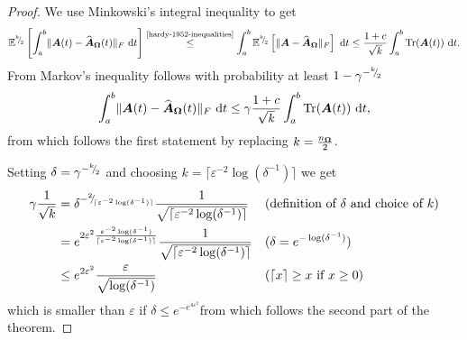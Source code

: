 \documentclass[12pt]{article}
\begin{document}
\begin{proof}
    We use Minkowski's integral inequality \cite[theorem 202]{hardy-1952-inequalities} to get
    \begin{equation}
        \mathbb{E}^{\sfrac{k}{2}}\left[ \int_{a}^{b} \lVert \mtx{A}(t) - \Nystr{\mtx{\Omega}}{\mtx{A}}(t) \rVert _F~\mathrm{d}t \right] 
        \stackrel{\text{\cite{hardy-1952-inequalities}}}{\leq} \int_{a}^{b} \mathbb{E}^{\sfrac{k}{2}} \left[\lVert \mtx{A} - \Nystr{\mtx{\Omega}}{\mtx{A}} \rVert _F \right] ~\mathrm{d}t%
        \leq \frac{1 + c}{\sqrt{k}} \int_{a}^{b} \Trace(\mtx{A}(t))~\mathrm{d}t.
    \end{equation}
    From Markov's inequality follows with probability at least $1 - \gamma^{-{}^{k}{\mskip -5mu/\mskip -3mu}_{2}}$
    \begin{equation}
        \int_{a}^{b} \lVert \boldsymbol{A}(t) - \widehat{\boldsymbol{A}}_{\boldsymbol{\Omega}}(t) \rVert _F~\mathrm{d}t \leq \gamma \frac{1 + c}{\sqrt{k}} \int_{a}^{b} \operatorname{Tr}(\boldsymbol{A}(t))~\mathrm{d}t,
    \end{equation}
    from which follows the first statement by replacing $k = \frac{n_{\boldsymbol{\Omega}}}{2}$.

    Setting $\delta = \gamma^{-{}^{k}{\mskip -5mu/\mskip -3mu}_{2}}$ and choosing $k = \lceil \varepsilon^{-2}\log(\delta^{-1}) \rceil$ we get
    \begin{align}
        \gamma \frac{1}{\sqrt{k}}
        &= \delta^{-{}^{2}{\mskip -5mu/\mskip -3mu}_{\lceil \varepsilon^{-2} \log(\delta^{-1}) \rceil}} \frac{1}{\sqrt{\lceil \varepsilon^{-2} \log(\delta^{-1}) \rceil}} && \text{(definition of $\delta$ and choice of $k$)} \notag \\
        &= e^{2\varepsilon^{2} \frac{\varepsilon^{-2}\log(\delta^{-1})}{\lceil \varepsilon^{-2} \log(\delta^{-1}) \rceil}} \frac{1}{\sqrt{\lceil \varepsilon^{-2} \log(\delta^{-1}) \rceil}} && \text{($\delta = e^{-\log(\delta^{-1})}$)} \notag \\ 
        &\leq e^{2\varepsilon^{2}} \frac{\varepsilon}{\sqrt{ \log(\delta^{-1})}} && \text{($\lceil x \rceil \geq x$ if $x \geq 0$)}
    \end{align}
    which is smaller than $\varepsilon$ if $\delta \leq e^{-e^{4 \varepsilon^2}}$from which follows the second part of the theorem.
\end{proof}
\end{document}
